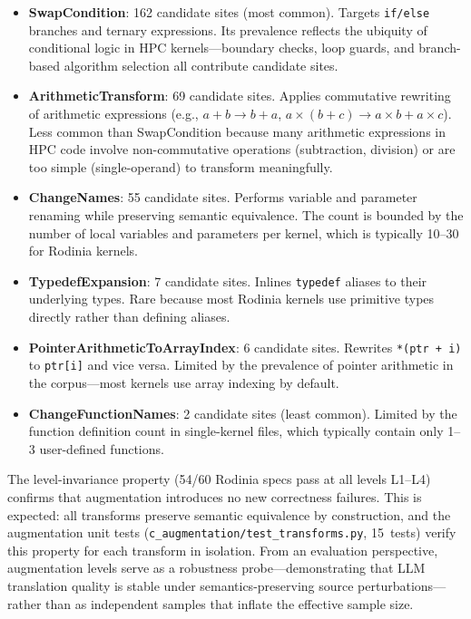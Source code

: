 \begin{itemize}
  \item \textbf{SwapCondition}: 162 candidate sites (most common). Targets
    \texttt{if/else} branches and ternary expressions. Its prevalence reflects
    the ubiquity of conditional logic in HPC kernels---boundary checks, loop
    guards, and branch-based algorithm selection all contribute candidate sites.

  \item \textbf{ArithmeticTransform}: 69 candidate sites. Applies commutative
    rewriting of arithmetic expressions (e.g., $a + b \rightarrow b + a$,
    $a \times (b + c) \rightarrow a \times b + a \times c$). Less common than
    SwapCondition because many arithmetic expressions in HPC code involve
    non-commutative operations (subtraction, division) or are too simple
    (single-operand) to transform meaningfully.

  \item \textbf{ChangeNames}: 55 candidate sites. Performs variable and
    parameter renaming while preserving semantic equivalence. The count is
    bounded by the number of local variables and parameters per kernel, which is
    typically 10--30 for Rodinia kernels.

  \item \textbf{TypedefExpansion}: 7 candidate sites. Inlines
    \texttt{typedef} aliases to their underlying types. Rare because most
    Rodinia kernels use primitive types directly rather than defining aliases.

  \item \textbf{PointerArithmeticToArrayIndex}: 6 candidate sites. Rewrites
    \texttt{*(ptr + i)} to \texttt{ptr[i]} and vice versa. Limited by the
    prevalence of pointer arithmetic in the corpus---most kernels use array
    indexing by default.

  \item \textbf{ChangeFunctionNames}: 2 candidate sites (least common). Limited
    by the function definition count in single-kernel files, which typically
    contain only 1--3 user-defined functions.
\end{itemize}

The level-invariance property (54/60 Rodinia specs pass at all levels L1--L4)
confirms that augmentation introduces no new correctness failures. This is
expected: all transforms preserve semantic equivalence by construction, and the
augmentation unit tests (\texttt{c\_augmentation/test\_transforms.py}, 15~tests)
verify this property for each transform in isolation. From an evaluation
perspective, augmentation levels serve as a robustness probe---demonstrating
that LLM translation quality is stable under semantics-preserving source
perturbations---rather than as independent samples that inflate the effective
sample size.

